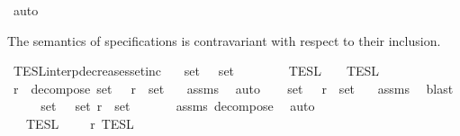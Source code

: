 \begin{isabellebody}
\ auto\isanewline
{}\isamarkupfalse%
%
\endisatagproof
{\isafoldproof}%
%
\isadelimproof
%
\endisadelimproof
%
\begin{isamarkuptext}%
The semantics of specifications is contravariant with respect to their inclusion.%
\end{isamarkuptext}\isamarkuptrue%
\isamarkupfalse%
\ TESL{\isacharunderscore}interp{\isacharunderscore}decreases{\isacharunderscore}setinc{\isacharcolon}\isanewline
\ \ \ {\isacartoucheopen}set\ {\isasymPhi}\ {\isasymsubseteq}\ set\ {\isasymPhi}{\isacharprime}{\isacartoucheclose}\isanewline
\ \ \ \ \ {\isacartoucheopen}{\isasymlbrakk}{\isasymlbrakk}\ {\isasymPhi}\ {\isasymrbrakk}{\isasymrbrakk}\isactrlsub T\isactrlsub E\isactrlsub S\isactrlsub L\ {\isasymsupseteq}\ {\isasymlbrakk}{\isasymlbrakk}\ {\isasymPhi}{\isacharprime}\ {\isasymrbrakk}{\isasymrbrakk}\isactrlsub T\isactrlsub E\isactrlsub S\isactrlsub L{\isacartoucheclose}\isanewline
%
\isadelimproof
%
\endisadelimproof
%
\isatagproof
{}\isamarkupfalse%
\ {\isacharminus}\isanewline
\ \ \isamarkupfalse%
\ {\isasymPhi}\isactrlsub r\ \ decompose{\isacharcolon}\ {\isacartoucheopen}set\ {\isacharparenleft}{\isasymPhi}\ {\isacharat}\ {\isasymPhi}\isactrlsub r{\isacharparenright}\ {\isacharequal}\ set\ {\isasymPhi}{\isacharprime}{\isacartoucheclose}\ \isamarkupfalse%
\ assms\ \isamarkupfalse%
\ auto\isanewline
\ \ \isamarkupfalse%
\ {\isacartoucheopen}set\ {\isacharparenleft}{\isasymPhi}\ {\isacharat}\ {\isasymPhi}\isactrlsub r{\isacharparenright}\ {\isacharequal}\ set\ {\isasymPhi}{\isacharprime}{\isacartoucheclose}\ \isamarkupfalse%
\ assms\ \isamarkupfalse%
\ blast\isanewline
\ \ \isamarkupfalse%
\ \isamarkupfalse%
\ {\isacartoucheopen}{\isacharparenleft}set\ {\isasymPhi}{\isacharparenright}\ {\isasymunion}\ {\isacharparenleft}set\ {\isasymPhi}\isactrlsub r{\isacharparenright}\ {\isacharequal}\ set\ {\isasymPhi}{\isacharprime}{\isacartoucheclose}\isanewline
\ \ \ \ \isamarkupfalse%
\ assms\ decompose\ \isamarkupfalse%
\ auto\isanewline
\ \ \isamarkupfalse%
\ \isamarkupfalse%
\ {\isacartoucheopen}{\isasymlbrakk}{\isasymlbrakk}\ {\isasymPhi}{\isacharprime}\ {\isasymrbrakk}{\isasymrbrakk}\isactrlsub T\isactrlsub E\isactrlsub S\isactrlsub L\ {\isacharequal}\ {\isasymlbrakk}{\isasymlbrakk}\ {\isasymPhi}\ {\isacharat}\ {\isasymPhi}\isactrlsub r\ {\isasymrbrakk}{\isasymrbrakk}\isactrlsub T\isactrlsub E\isactrlsub S\isactrlsub L{\isacartoucheclose}\isanewline

\end{isabellebody}
